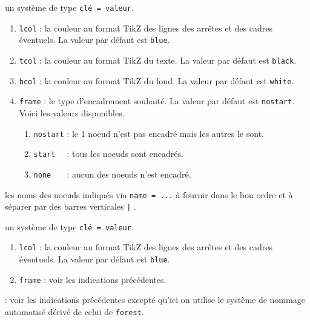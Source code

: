 \documentclass[12pt,a4paper]{article}
\begin{document}
%
%
%
%
%




\separation



\IDoption{} un système de type \texttt{clé = valeur}.

\begin{enumerate}    
    \item \verb#lcol# : la couleur au format TikZ des lignes des arrêtes et des cadres éventuels. La valeur par défaut est \verb#blue#.

    \item \verb#tcol# : la couleur au format TikZ du texte. La valeur par défaut est \verb#black#.

    \item \verb#bcol# : la couleur au format TikZ du fond. La valeur par défaut est \verb#white#.
    
    \extraspace
    
    \item \verb#frame# : le type d'encadrement souhaité. La valeur par défaut est \verb#nostart#. Voici les valeurs disponibles.
    \begin{enumerate}
    	\item \verb#nostart# : le 1\ier{} noeud n'est pas encadré mais les autres le sont.

    	\item \verb#start  # : tous les noeuds sont encadrés. 

    	\item \verb#none   # : aucun des noeuds n'est encadré.
    \end{enumerate}
\end{enumerate}

\IDarg{} les noms des noeuds indiqués via \verb#name = ...# à fournir dans le bon ordre et à séparer par des barres verticales \verb#|# .


\bigskip



\IDoption{} un système de type \texttt{clé = valeur}.

\begin{enumerate}    
    \item \verb#lcol# : la couleur au format TikZ des lignes des arrêtes et des cadres éventuels. La valeur par défaut est \verb#blue#.

    \extraspace
    
    \item \verb#frame# : voir les indications précédentes.
\end{enumerate}

\IDarg{} : voir les indications précédentes excepté qu'ici on utilise le système de nommage automatisé dérivé de celui de \verb#forest#.
\end{document}

